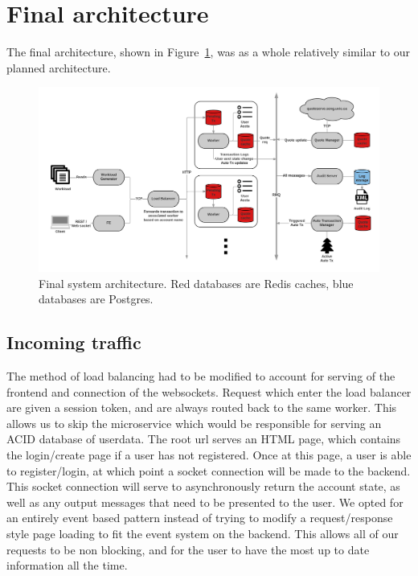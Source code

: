 \section{Final architecture}
The final architecture, shown in Figure~\ref{fig:arch-final}, was as a whole relatively similar to our planned architecture. 

\begin{figure}[tbph]
  \centering
  \includegraphics[width=0.85\linewidth]{graphics/arch-final}
  \caption[Final system architecture]{Final system architecture. Red databases are Redis caches, blue databases are Postgres.}
  \label{fig:arch-final}
\end{figure}

\subsection{Incoming traffic}
The method of load balancing had to be modified to account for serving of the frontend and connection of the websockets.
Request which enter the load balancer are given a session token, and are always routed back to the same worker.
This allows us to skip the microservice which would be responsible for serving an ACID database of userdata.
The root url serves an HTML page, which contains the login/create page if a user has not registered.
Once at this page, a user is able to register/login, at which point a socket connection will be made to the backend.
This socket connection will serve to asynchronously return the account state, as well as any output messages that need to be presented to the user.
We opted for an entirely event based pattern instead of trying to modify a request/response style page loading to fit the event system on the backend.
This allows all of our requests to be non blocking, and for the user to have the most up to date information all the time.


